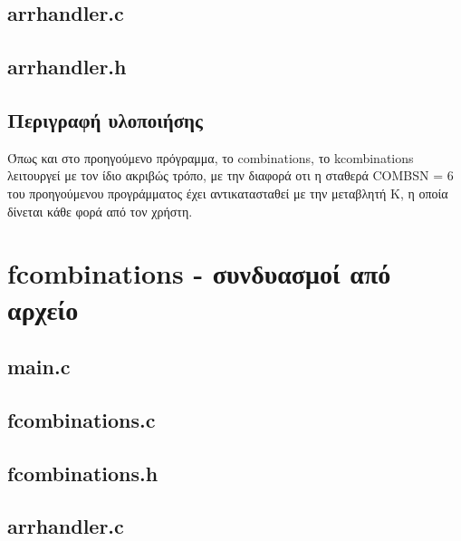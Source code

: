 \documentclass{article}
\begin{document}
    \subsection{arrhandler.c}
        

    \subsection{arrhandler.h}
         

    \subsection{Περιγραφή υλοποιήσης}

    Όπως και στο προηγούμενο πρόγραμμα, το combinations, το kcombinations λειτουργεί με τον ίδιο ακριβώς τρόπο,
    με την διαφορά οτι η σταθερά COMBSN = 6 του προηγούμενου προγράμματος έχει αντικατασταθεί με την μεταβλητή Κ,
    η οποία δίνεται κάθε φορά από τον χρήστη.

\section{fcombinations - συνδυασμοί από αρχείο}

    \subsection{main.c}
        

    \subsection{fcombinations.c}
        

    \subsection{fcombinations.h}
        

    \subsection{arrhandler.c}
        
\end{document}
